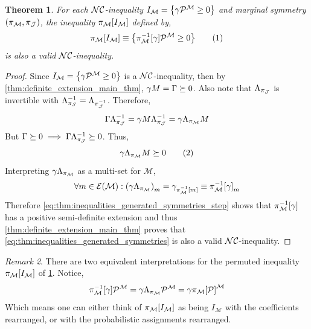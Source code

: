 \documentclass[aps, 10pt, english, twoside, pra, nofootinbib, longbibliography]{revtex4-1}
\theoremstyle{plain}
\newtheorem{theorem}{Theorem}
\theoremstyle{definition}
\theoremstyle{remark}
\newtheorem{remark}[theorem]{Remark}
\newcommand{\mscenario}{\mathcal{M}}
\newcommand{\jointvar}{\mathcal{J}}
\newcommand{\tcdot}{} %
\newcommand{\PermM}[1]{\La_{#1}} %
\newcommand{\Events}[1]{\s{E}\br{#1}} %
\begin{document}
    \begin{theorem}
        \label{thm:inequalities_generated_symmetries}
        For each $\mathcal{NC}$-inequality $I_{\mscenario} = \bc{\ga \tcdot \probvec^{\mscenario} \geq 0}$ and marginal symmetry $\br{\pi_{\mscenario}, \pi_{\jointvar}}$, the inequality $\pi_{\mscenario}\bs{I_{\mscenario}}$ defined by,
        \[ \pi_{\mscenario}\bs{I_{\mscenario}} \defined \bc{\pi^{-1}_{\mscenario}\bs{\ga} \tcdot \probvec^{\mscenario} \geq 0} \eq \label{eq:thm:inequalities_generated_symmetries}\]
        is also a valid $\mathcal{NC}$-inequality.
    \end{theorem}
    \begin{proof}
        Since $I_{\mscenario} = \bc{\ga \tcdot \probvec^{\mscenario} \geq 0}$ is a $\mathcal{NC}$-inequality, then by \cref{thm:definite_extension_main_thm}, $\ga \tcdot M = \Ga \succeq 0$. Also note that $\PermM{\pi_{\jointvar}}$ is invertible with $\PermM{\pi_{\jointvar}}^{-1} = \PermM{\pi^{-1}_{\jointvar}}$. Therefore,
        \[ \Ga\tcdot\PermM{\pi_{\jointvar}}^{-1} = \ga \tcdot M \tcdot \PermM{\pi_{\jointvar}}^{-1} = \ga\tcdot \PermM{\pi_{\mscenario}}\tcdot M \]
        But $\Ga \succeq 0 \implies \Ga\tcdot\PermM{\pi_{\jointvar}}^{-1} \succeq 0$. Thus,
        \[ \ga\tcdot\PermM{\pi_{\mscenario}}\tcdot M \succeq 0 \eq \label{eq:thm:inequalities_generated_symmetries_step}\]
        Interpreting $\ga\tcdot\PermM{\pi_{\mscenario}}$ as a multi-set for $\mscenario$,
        \[ \forall m \in \Events{\mscenario} : \br{\ga\tcdot\PermM{\pi_{\mscenario}}}_m = \ga_{\pi^{-1}_{\mscenario}\bs{m}} \defined \pi^{-1}_{\mscenario}\bs{\ga}_m \]
        Therefore \cref{eq:thm:inequalities_generated_symmetries_step} shows that $\pi^{-1}_{\mscenario}\bs{\ga}$ has a positive semi-definite extension and thus \cref{thm:definite_extension_main_thm} proves that \cref{eq:thm:inequalities_generated_symmetries} is also a valid $\mathcal{NC}$-inequality.
    \end{proof}
    \begin{remark}
        There are two equivalent interpretations for the permuted inequality $\pi_{\mscenario}\bs{I_{\mscenario}}$ of \cref{thm:inequalities_generated_symmetries}. Notice,
        \[ \pi^{-1}_{\mscenario}\bs{\ga} \tcdot \probvec^{\mscenario} = \ga \tcdot \La_{\pi_{\mscenario}} \tcdot \probvec^{\mscenario} = \ga \tcdot \pi_{\mscenario}\bs{\probvec}^{\mscenario} \]
        Which means one can either think of $\pi_{\mscenario}\bs{I_{\mscenario}}$ as being $I_{\mscenario}$ with the coefficients rearranged, or with the probabilistic assignments rearranged.
    \end{remark}
\end{document}

